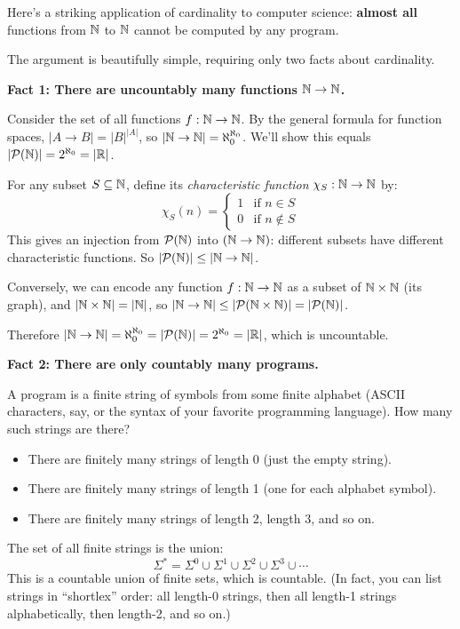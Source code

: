 \begin{keyresult}
Here's a striking application of cardinality to computer science: \textbf{almost all} functions from $\mathbb{N}$ to $\mathbb{N}$ cannot be computed by any program.

The argument is beautifully simple, requiring only two facts about cardinality.

\textbf{Fact 1: There are uncountably many functions $\mathbb{N} \to \mathbb{N}$.}

Consider the set of all functions $f: \mathbb{N} \to \mathbb{N}$. By the general formula for function spaces, $|A \to B| = |B|^{|A|}$, so $|\mathbb{N} \to \mathbb{N}| = \aleph_0^{\aleph_0}$. We'll show this equals $|\mathcal{P}(\mathbb{N})| = 2^{\aleph_0} = |\mathbb{R}|$.

For any subset $S \subseteq \mathbb{N}$, define its \emph{characteristic function} $\chi_S: \mathbb{N} \to \mathbb{N}$ by:
\[
\chi_S(n) = \begin{cases} 1 & \text{if } n \in S \\ 0 & \text{if } n \notin S \end{cases}
\]
This gives an injection from $\mathcal{P}(\mathbb{N})$ into $(\mathbb{N} \to \mathbb{N})$: different subsets have different characteristic functions. So $|\mathcal{P}(\mathbb{N})| \leq |\mathbb{N} \to \mathbb{N}|$.

Conversely, we can encode any function $f: \mathbb{N} \to \mathbb{N}$ as a subset of $\mathbb{N} \times \mathbb{N}$ (its graph), and $|\mathbb{N} \times \mathbb{N}| = |\mathbb{N}|$, so $|\mathbb{N} \to \mathbb{N}| \leq |\mathcal{P}(\mathbb{N} \times \mathbb{N})| = |\mathcal{P}(\mathbb{N})|$.

Therefore $|\mathbb{N} \to \mathbb{N}| = \aleph_0^{\aleph_0} = |\mathcal{P}(\mathbb{N})| = 2^{\aleph_0} = |\mathbb{R}|$, which is uncountable.

\textbf{Fact 2: There are only countably many programs.}

A program is a finite string of symbols from some finite alphabet (ASCII characters, say, or the syntax of your favorite programming language). How many such strings are there?

\begin{itemize}
  \item There are finitely many strings of length 0 (just the empty string).
  \item There are finitely many strings of length 1 (one for each alphabet symbol).
  \item There are finitely many strings of length 2, length 3, and so on.
\end{itemize}

The set of all finite strings is the union:
\[
\Sigma^* = \Sigma^0 \cup \Sigma^1 \cup \Sigma^2 \cup \Sigma^3 \cup \cdots
\]
This is a countable union of finite sets, which is countable. (In fact, you can list strings in ``shortlex'' order: all length-0 strings, then all length-1 strings alphabetically, then length-2, and so on.)


\end{keyresult}
